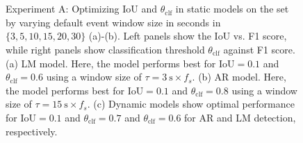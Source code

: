 \begin{figure}
    \centering
    \myfloatalign   
      \\
     \\
    \caption[MSEDv1 Experiment A results]{Experiment A: Optimizing IoU and $\theta_{\mathrm{clf}}$ in static models on the \eval{} set by varying default event window size in seconds in $\lbrace3, 5, 10, 15, 20, 30 \rbrace$ (a)-(b). Left panels show the IoU vs. F1 score, while right panels show classification threshold $\theta_{\mathrm{clf}}$ against F1 score. (a) LM model. Here, the model performs best for $\mathrm{IoU}=0.1$ and $\theta_{\mathrm{clf}} = 0.6$ using a window size of $\tau=\SI{3}{\second}\times f_{s}$. (b) AR model. Here, the model performs best for $\mathrm{IoU}=0.1$ and $\theta_{\mathrm{clf}} = 0.8$ using a window size of $\tau=\SI{15}{\second} \times f_{s}$. (c) Dynamic models show optimal performance for $\mathrm{IoU}=0.1$ and $\theta_{\mathrm{clf}}=0.7$ and $\theta_{\mathrm{clf}}=0.6$ for AR and LM detection, respectively.}
    \label{fig:paperiv-experiment_a}
\end{figure}


